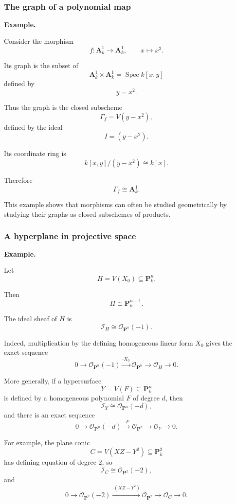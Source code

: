 \documentclass[12pt,a4paper]{article}
\theoremstyle{notespace}
\begin{document}
\subsubsection{The graph of a polynomial map}

\textbf{Example.}

Consider the morphism
\[
f:\mathbf A^1_k\longrightarrow\mathbf A^1_k,
\qquad
x\longmapsto x^2.
\]

Its graph is the subset of
\[
\mathbf A^1_k\times\mathbf A^1_k
=
\operatorname{Spec}k[x,y]
\]
defined by
\[
y=x^2.
\]

Thus the graph is the closed subscheme
\[
\Gamma_f=V(y-x^2),
\]
defined by the ideal
\[
I=(y-x^2).
\]

Its coordinate ring is
\[
k[x,y]/(y-x^2)\cong k[x].
\]

Therefore
\[
\Gamma_f\cong\mathbf A^1_k.
\]

This example shows that morphisms can often be studied geometrically by studying their graphs as closed subschemes of products.

\subsubsection{A hyperplane in projective space}

\textbf{Example.}

Let
\[
H=V(X_0)\subseteq\mathbf P^n_k.
\]

Then
\[
H\cong\mathbf P^{n-1}_k.
\]

The ideal sheaf of \(H\) is
\[
\mathcal I_H\cong\mathcal O_{\mathbf P^n}(-1).
\]

Indeed, multiplication by the defining homogeneous linear form \(X_0\) gives the exact sequence
\[
0
\longrightarrow
\mathcal O_{\mathbf P^n}(-1)
\xrightarrow{\cdot X_0}
\mathcal O_{\mathbf P^n}
\longrightarrow
\mathcal O_H
\longrightarrow
0.
\]

More generally, if a hypersurface
\[
Y=V(F)\subseteq\mathbf P^n_k
\]
is defined by a homogeneous polynomial \(F\) of degree \(d\), then
\[
\mathcal I_Y\cong\mathcal O_{\mathbf P^n}(-d),
\]
and there is an exact sequence
\[
0
\longrightarrow
\mathcal O_{\mathbf P^n}(-d)
\xrightarrow{\cdot F}
\mathcal O_{\mathbf P^n}
\longrightarrow
\mathcal O_Y
\longrightarrow
0.
\]

For example, the plane conic
\[
C=V(XZ-Y^2)\subseteq\mathbf P^2_k
\]
has defining equation of degree \(2\), so
\[
\mathcal I_C\cong\mathcal O_{\mathbf P^2}(-2),
\]
and
\[
0
\longrightarrow
\mathcal O_{\mathbf P^2}(-2)
\xrightarrow{\cdot(XZ-Y^2)}
\mathcal O_{\mathbf P^2}
\longrightarrow
\mathcal O_C
\longrightarrow
0.
\]
\end{document}
